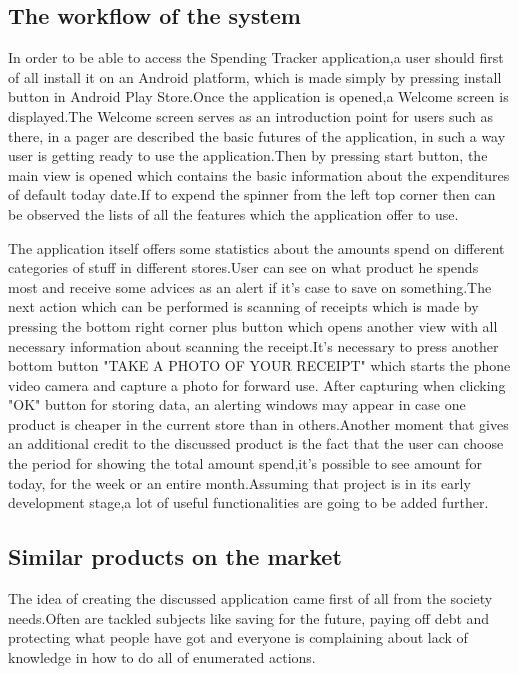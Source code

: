 \subsection{The workflow of the system}
In order to be able to access the Spending Tracker application,a user should first of all install it on an Android platform, which is made simply by pressing install button in Android Play Store.Once the application is opened,a Welcome screen is displayed.The Welcome screen serves as an introduction point for users such as there, in a pager are described the basic futures of the application, in such a way user is getting ready to use the application.Then by pressing start button, the main view is opened which contains the basic information about the expenditures of default today date.If to expend the spinner from the left top corner then can be observed the lists of all the features which the application offer to use.

The application itself offers some statistics about the amounts spend on different categories of stuff in different stores.User can see on what product he spends most and receive some advices as an alert if it's case to save on something.The next action which can be performed is scanning of receipts which is made by pressing the bottom right corner plus button which opens another view with all necessary information about scanning the receipt.It's necessary to press another bottom button "TAKE A PHOTO OF YOUR RECEIPT" which starts the phone video camera and capture a photo for forward use. After capturing when clicking "OK" button for storing data, an alerting windows may appear in case one product is cheaper in the current store than in others.Another moment that gives an additional credit to the discussed product is the fact that the user can choose the period for showing the total amount spend,it's possible to see amount for today, for the week or an entire month.Assuming that project is in its early development stage,a lot of useful functionalities are going to be added further.

\subsection{Similar products on the market}
The idea of creating the discussed application came first of all from the society needs.Often are tackled subjects like saving for the future, paying off debt and protecting what people have got and everyone is complaining about lack of knowledge in how to do all of enumerated actions.

